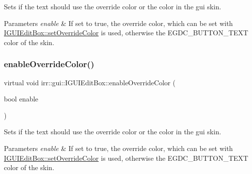 Sets if the text should use the override color or the color in the gui skin. 


\begin{DoxyParams}{Parameters}
{\em enable} & If set to true, the override color, which can be set with \hyperlink{classirr_1_1gui_1_1IGUIEditBox_aa134d2a36c52abcb4881da0267031c47}{I\+G\+U\+I\+Edit\+Box\+::set\+Override\+Color} is used, otherwise the E\+G\+D\+C\+\_\+\+B\+U\+T\+T\+O\+N\+\_\+\+T\+E\+XT color of the skin. \\
\hline
\end{DoxyParams}
\mbox{\label{classirr_1_1gui_1_1IGUIEditBox_a121ab76cb2b69bbc4238921095917346}} 
\subsubsection{\texorpdfstring{enable\+Override\+Color()}{enableOverrideColor()}\hspace{0.1cm}{\footnotesize\ttfamily [2/2]}}
{\footnotesize\ttfamily virtual void irr\+::gui\+::\+I\+G\+U\+I\+Edit\+Box\+::enable\+Override\+Color (\begin{DoxyParamCaption}\item[{bool}]{enable }\end{DoxyParamCaption})\hspace{0.3cm}{\ttfamily [pure virtual]}}



Sets if the text should use the override color or the color in the gui skin. 


\begin{DoxyParams}{Parameters}
{\em enable} & If set to true, the override color, which can be set with \hyperlink{classirr_1_1gui_1_1IGUIEditBox_aa134d2a36c52abcb4881da0267031c47}{I\+G\+U\+I\+Edit\+Box\+::set\+Override\+Color} is used, otherwise the E\+G\+D\+C\+\_\+\+B\+U\+T\+T\+O\+N\+\_\+\+T\+E\+XT color of the skin. \\
\hline
\end{DoxyParams}
\mbox{\label{classirr_1_1gui_1_1IGUIEditBox_a50542fa7f03a48458fac258a0949d987}} 
